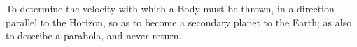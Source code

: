 To determine the velocity with which a Body
must be thrown, in a direction parallel to the 
Horizon, so as to become a secondary planet 
to the Earth; as also to describe a parabola, 
and never return.
